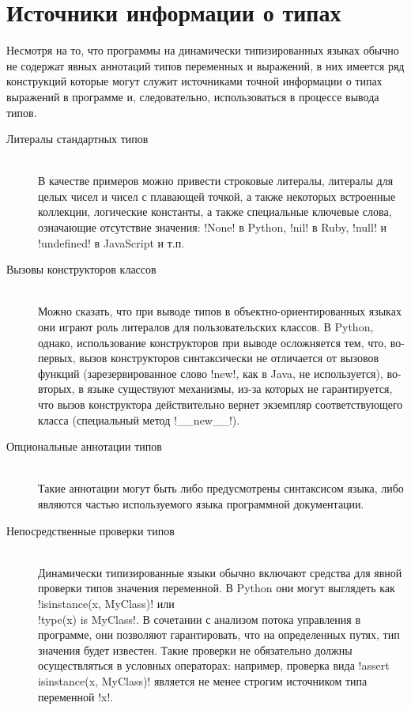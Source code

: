 \section{Источники информации о типах}
\label{sec:type-sources}

Несмотря на то, что программы на динамически типизированных языках обычно не
содержат явных аннотаций типов переменных и выражений, в них
имеется ряд конструкций которые могут служит источниками точной информации о
типах выражений в программе и, следовательно, использоваться в процессе вывода
типов.

\begin{description}
    \item[Литералы стандартных типов] \hfill \\
        В качестве примеров можно привести
        строковые литералы, литералы для целых чисел и чисел с плавающей точкой,
        а также некоторых встроенные коллекции,
        логические константы, а также специальные ключевые слова, означающие
        отсутствие значения: !None! в Python, !nil! в Ruby,
        !null! и !undefined! в JavaScript и т.п.
        
    \item[Вызовы конструкторов классов] \hfill \\
        Можно сказать, что при выводе типов в объектно-ориентированных языках
        они играют роль литералов для пользовательских классов. В Python, однако,
        использование конструкторов при выводе осложняется тем, что, во-первых, вызов
        конструкторов синтаксически не отличается от вызовов функций
        (зарезервированное слово !new!, как в Java, не используется), во-вторых,
        в языке существуют механизмы, из-за которых не гарантируется, что вызов
        конструктора действительно вернет экземпляр соответствующего класса
        (специальный метод !__new__!).

    \item[Опциональные аннотации типов] \hfill \\
        Такие аннотации могут быть либо предусмотрены синтаксисом языка, либо
        являются частью используемого языка программной документации.

    \item[Непосредственные проверки типов] \hfill \\
        Динамически типизированные языки обычно включают средства для явной
        проверки типов значения переменной. В Python они могут
        выглядеть как !isinstance(x, MyClass)! или \\
        !type(x) is MyClass!. В
        сочетании с анализом потока управления в программе, они позволяют
        гарантировать, что на определенных путях, тип значения будет известен. 
        Такие проверки не обязательно должны осуществляться в условных
        операторах: например, проверка вида !assert isinstance(x, MyClass)!
        является не менее строгим источником типа переменной !x!.


\end{description}
